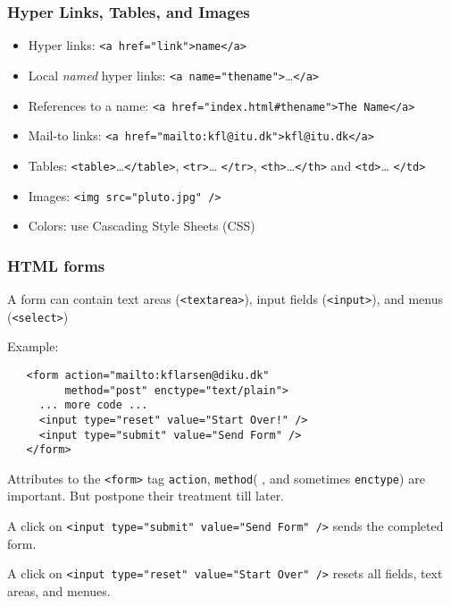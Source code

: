 \documentclass[dvipsnames,handout]{beamer}
\begin{document}
\begin{frame}
\frametitle{Hyper Links, Tables, and Images}
\begin{itemize}
\item Hyper links: \texttt{<a href="link">name</a>}
\item Local \emph{named} hyper links: \texttt{<a
    name="thename">}\ldots\texttt{</a>}
\item References to a name: \texttt{<a href="index.html\#thename">The Name</a>}
\item Mail-to links: \texttt{<a href="mailto:kfl@itu.dk">kfl@itu.dk</a>}
\item Tables: \texttt{<table>}\ldots \texttt{</table>}, \texttt{<tr>}\ldots
  \texttt{</tr>}, \texttt{<th>}\ldots \texttt{</th>} and \texttt{<td>}\ldots
  \texttt{</td>}
\item Images: \texttt{<img src="pluto.jpg" />}
\item Colors: use Cascading Style Sheets (CSS)
\end{itemize}
\end{frame}

\begin{frame}[fragile]
\frametitle{HTML forms}
  
A form can contain text areas (\verb+<textarea>+),
input fields (\verb+<input>+), and menus (\verb+<select>+)

Example: 

\begin{verbatim}
   <form action="mailto:kflarsen@diku.dk" 
         method="post" enctype="text/plain">
     ... more code ...
     <input type="reset" value="Start Over!" />
     <input type="submit" value="Send Form" />
   </form>
\end{verbatim}

Attributes to the \verb+<form>+ tag \texttt{action}, \texttt{method}( ,
and sometimes \texttt{enctype}) are important.  But postpone their
treatment till later.

  
  

A click on \verb+<input type="submit" value="Send Form" />+ sends the
completed form.

A click on \verb+<input type="reset" value="Start Over" />+ resets all
fields, text areas, and menues.
\end{frame}
\end{document}
